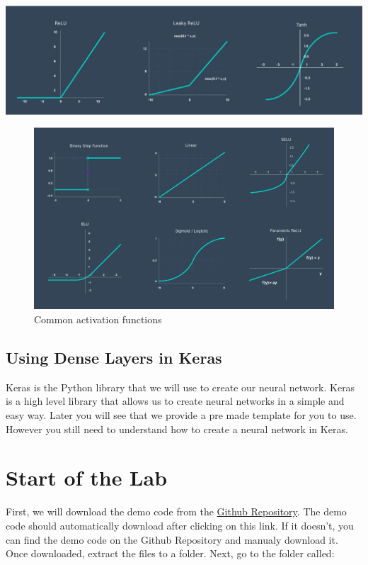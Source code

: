 \documentclass[11pt]{report}
\begin{document}
\includegraphics[width=1\textwidth]{activation functions 1.jpg}
\begin{figure}
    \begin{center}
    \includegraphics[width=1\textwidth]{activation functions 2.jpg}
    \caption{Common activation functions}
    \label{fig:activation_functions}
    \end{center}
\end{figure}

\pagebreak

\section{Using Dense Layers in Keras}
Keras is the Python library that we will use to create our neural network. Keras is a high level library that allows us to create neural networks in a simple and easy way. Later you will see that we provide a pre made template for you to use. However you still need to understand how to create a neural network in Keras.


\chapter{Start of the Lab}
First, we will download the demo code from the \href{https://github.com/PiCarV/Demos/archive/refs/heads/main.zip}{Github Repository}. The demo code should automatically download after clicking on this link. If it doesn't, you can find the demo code on the Github Repository and manualy download it. Once downloaded, extract the files to a folder. Next, go to the folder called:
\end{document}
